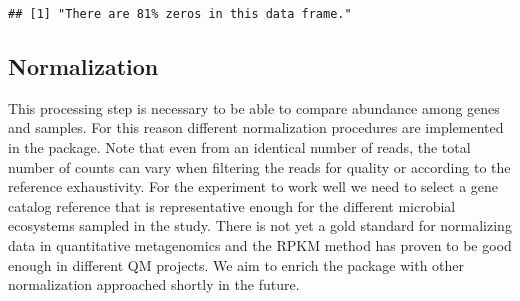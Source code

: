 \documentclass[]{article}
\newenvironment{Shaded}{\begin{snugshade}}{\end{snugshade}}
\newcommand{\KeywordTok}[1]{\textcolor[rgb]{0.13,0.29,0.53}{\textbf{{#1}}}}
\newcommand{\DataTypeTok}[1]{\textcolor[rgb]{0.13,0.29,0.53}{{#1}}}
\newcommand{\DecValTok}[1]{\textcolor[rgb]{0.00,0.00,0.81}{{#1}}}
\newcommand{\StringTok}[1]{\textcolor[rgb]{0.31,0.60,0.02}{{#1}}}
\newcommand{\NormalTok}[1]{{#1}}
\begin{document}
\begin{Shaded}
\end{Shaded}

\begin{verbatim}
## [1] "There are 81% zeros in this data frame."
\end{verbatim}

\subsection{Normalization}\label{normalization}

This processing step is necessary to be able to compare abundance among
genes and samples. For this reason different normalization procedures
are implemented in the package. Note that even from an identical number
of reads, the total number of counts can vary when filtering the reads
for quality or according to the reference exhaustivity. For the
experiment to work well we need to select a gene catalog reference that
is representative enough for the different microbial ecosystems sampled
in the study. There is not yet a gold standard for normalizing data in
quantitative metagenomics and the RPKM method has proven to be good
enough in different QM projects. We aim to enrich the package with other
normalization approached shortly in the future.
\end{document}
